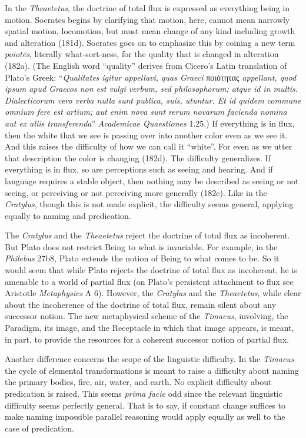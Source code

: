 In the \emph{Theaetetus}, the doctrine of total flux is expressed as everything being in motion. Socrates begins by clarifying that motion, here, cannot mean narrowly spatial motion, locomotion, but must mean change of any kind including growth and alteration (181d). Socrates goes on to emphasize this by coining a new term \emph{poiotēs}, literally what-sort-ness, for the quality that is changed in alteration (182a). (The English word ``quality'' derives from Cicero's Latin translation of Plato's Greek: ``\emph{Qualitates igitur appellavi, quas Graeci} {\sbl ποιότητας} \emph{appellant, quod ipsum apud Graecos non est vulgi verbum, sed philosophorum; atque id in multis. Dialecticorum vero verba nulla sunt publica, suis, utuntur. Et id quidem commune omnium fere est artium; aut enim nova sunt rerum novarum facienda nomina aut ex aliis transferenda}'' \emph{Academicae Quaestiones} 1.25.) If everything is in flux, then the white that we see is passing over into another color even as we see it. And this raises the difficulty of how we can call it ``white''. For even as we utter that description the color is changing (182d). The difficulty generalizes. If everything is in flux, so are perceptions such as seeing and hearing. And if language requires a stable object, then nothing may be described as seeing or not seeing, or perceiving or not perceiving more generally (182e). Like in the \emph{Cratylus}, though this is not made explicit, the difficulty seems general, applying equally to naming and predication.

The \emph{Cratylus} and the \emph{Theaetetus} reject the doctrine of total flux as incoherent. But Plato does not restrict Being to what is invariable. For example, in the \emph{Philebus} 27b8, Plato extends the notion of Being to what comes to be. So it would seem that while Plato rejects the doctrine of total flux as incoherent, he is amenable to a world of partial flux (on Plato's persistent attachment to flux see Aristotle \emph{Metaphysics} A 6). However, the \emph{Cratylus} and the \emph{Theaetetus}, while clear about the incoherence of the doctrine of total flux, remain silent about any successor notion. The new metaphysical scheme of the \emph{Timaeus}, involving, the Paradigm, its image, and the Receptacle in which that image appears, is meant, in part, to provide the resources for a coherent successor notion of partial flux.

Another difference concerns the scope of the linguistic difficulty. In the \emph{Timaeus} the cycle of elemental transformations is meant to raise a difficulty about naming the primary bodies, fire, air, water, and earth. No explicit difficulty about predication is raised. This seems \emph{prima facie} odd since the relevant linguistic difficulty seems perfectly general. That is to say, if constant change suffices to make naming impossible parallel reasoning would apply equally as well to the case of predication.

